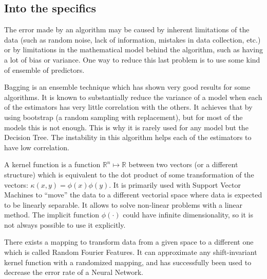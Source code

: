 \documentclass{article}
\begin{document}
    \subsection{Into the specifics}
    The error made by an algorithm may be caused by inherent limitations of the
    data (such as random noise, lack of information, mistakes in data
    collection, etc.) or by limitations in the mathematical model behind the
    algorithm, such as having a lot of bias or variance. One way to reduce this
    last problem is to use some kind of ensemble of predictors.

    Bagging\cite{breiman94} is an ensemble technique which has shown very good results for
    some algorithms. It is known to substantially reduce the variance of a model when each of the estimators has very little correlation with the others. It
    achieves that by using bootstrap (a random sampling with
    replacement), but for most of the models this is not enough. This is why it is rarely used for any model but the Decision Tree. The instability in this
    algorithm helps each of the estimators to have low correlation.


    A kernel function \cite{kernels} is a function $\mathbb{R}^n \mapsto \mathbb{R}$ between
    two vectors (or a different structure)  which is equivalent to the dot
    product of some transformation of the vectors:
    $\kappa(x,y) = \phi(x)\phi(y)$.
    It is primarily used with Support Vector Machines to ``move'' the data to
    a different vectorial space where data is expected to be linearly separable.
    It allows to solve non-linear problems with a linear method. The implicit
    function $\phi(\cdot)$ could have infinite dimensionality, so it is not always
    possible to use it explicitly.

    There exists a mapping to transform data from a given space to a different
    one which is called Random Fourier Features\cite{rahimi07}. It can approximate any
    shift-invariant kernel function with a randomized mapping, and has successfully
    been used to decrease the error rate of a Neural Network\cite{zhangs17}.
\end{document}
